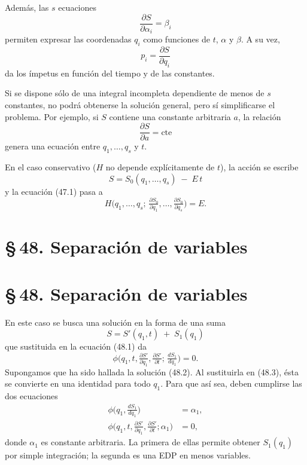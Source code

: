 \documentclass[12pt]{article}
\begin{document}
\noindent Además, las \(s\) ecuaciones
\begin{equation}
\frac{\partial S}{\partial \alpha_i} = \beta_i
\tag{47.4}
\end{equation}
permiten expresar las coordenadas \(q_i\) como funciones de \(t\), \(\alpha\) y \(\beta\). A su vez,
\[
p_i = \frac{\partial S}{\partial q_i}
\]
da los ímpetus en función del tiempo y de las constantes.

\noindent Si se dispone sólo de una integral incompleta dependiente de menos de \(s\) constantes, no podrá obtenerse la solución general, pero sí simplificarse el problema. Por ejemplo, si \(S\) contiene una constante arbitraria \(a\), la relación
\[
\frac{\partial S}{\partial a} = \text{cte}
\]
genera una ecuación entre \(q_1,\dots,q_s\) y \(t\).

\noindent En el caso conservativo (\(H\) no depende explícitamente de \(t\)), la acción se escribe
\begin{equation}
S = S_0(q_1,\dots,q_s)\;-\;E\,t
\tag{47.5}
\end{equation}
y la ecuación (47.1) pasa a
\begin{equation}
H\bigl(q_1,\dots,q_s;\,\tfrac{\partial S_0}{\partial q_1},\dots,\tfrac{\partial S_0}{\partial q_s}\bigr)
=E.
\tag{47.6}
\end{equation}

\section*{\S\,48. Separación de variables}
\section*{\S\,48. Separación de variables}

\noindent En este caso se busca una solución en la forma de una suma
\begin{equation}
S = S'(q_{1},t) \;+\; S_{1}(q_{1})
\tag{48.2}
\end{equation}
que sustituida en la ecuación (48.1) da
\begin{equation}
\phi\!\bigl(q_{1},t,\tfrac{\partial S'}{\partial q_{1}},
\tfrac{\partial S'}{\partial t};\,\tfrac{dS_{1}}{dq_{1}}\bigr)
=0.
\tag{48.3}
\end{equation}
Supongamos que ha sido hallada la solución (48.2). Al sustituirla en (48.3), ésta se convierte en una identidad para todo \(q_{1}\). Para que así sea, deben cumplirse las dos ecuaciones
\begin{align}
\phi\!\bigl(q_{1},\tfrac{dS_{1}}{dq_{1}}\bigr)&=\alpha_{1},
\tag{48.4}\\
\phi\!\bigl(q_{1},t,\tfrac{\partial S'}{\partial q_{1}},
\tfrac{\partial S'}{\partial t};\alpha_{1}\bigr)&=0,
\tag{48.5}
\end{align}
donde \(\alpha_{1}\) es constante arbitraria. La primera de ellas permite obtener \(S_{1}(q_{1})\) por simple integración; la segunda es una EDP en menos variables.
\end{document}

